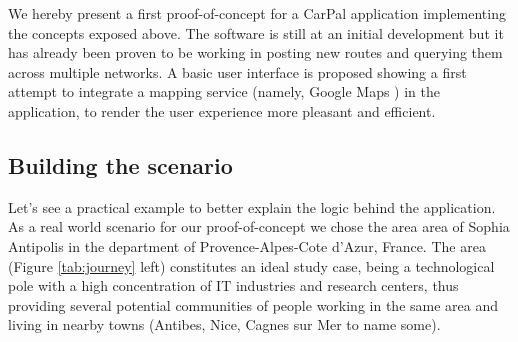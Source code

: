 We hereby present a first proof-of-concept for a CarPal application
implementing the concepts exposed above.  The software is still at an
initial development but it has already been proven to be working in
posting new routes and querying them across multiple networks.  A
basic user interface is proposed showing a first attempt to integrate
a mapping service (namely, Google Maps \cite{googlemaps:website}) in
the application, to render the user experience more pleasant and
efficient.
 
%
\subsection{Building the scenario}
%
Let's see a practical example to better explain the logic behind the
application.  As a real world scenario for our proof-of-concept we
chose the area area of Sophia Antipolis in the department of
Provence-Alpes-Cote d'Azur, France. The area (Figure \ref{tab:journey}
left) constitutes an ideal study case, being a technological pole with
a high concentration of IT industries and research centers, thus
providing several potential communities of people working in the same
area and living in nearby towns (Antibes, Nice, Cagnes sur Mer to name
some).
 

